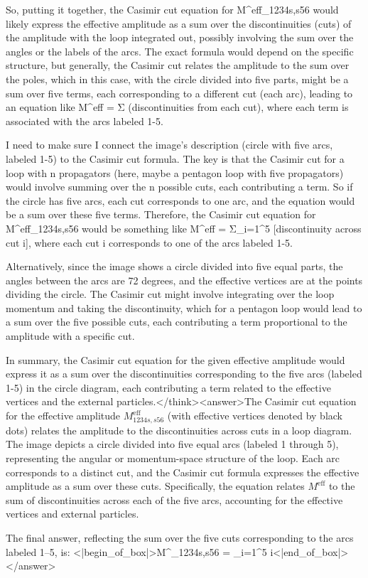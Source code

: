 So, putting it together, the Casimir cut equation for M^eff_1234s,s56 would likely express the effective amplitude as a sum over the discontinuities (cuts) of the amplitude with the loop integrated out, possibly involving the sum over the angles or the labels of the arcs. The exact formula would depend on the specific structure, but generally, the Casimir cut relates the amplitude to the sum over the poles, which in this case, with the circle divided into five parts, might be a sum over five terms, each corresponding to a different cut (each arc), leading to an equation like M^eff = Σ (discontinuities from each cut), where each term is associated with the arcs labeled 1-5. 

I need to make sure I connect the image's description (circle with five arcs, labeled 1-5) to the Casimir cut formula. The key is that the Casimir cut for a loop with n propagators (here, maybe a pentagon loop with five propagators) would involve summing over the n possible cuts, each contributing a term. So if the circle has five arcs, each cut corresponds to one arc, and the equation would be a sum over these five terms. Therefore, the Casimir cut equation for M^eff_1234s,s56 would be something like M^eff = Σ_{i=1}^5 [discontinuity across cut i], where each cut i corresponds to one of the arcs labeled 1-5. 

Alternatively, since the image shows a circle divided into five equal parts, the angles between the arcs are 72 degrees, and the effective vertices are at the points dividing the circle. The Casimir cut might involve integrating over the loop momentum and taking the discontinuity, which for a pentagon loop would lead to a sum over the five possible cuts, each contributing a term proportional to the amplitude with a specific cut. 

In summary, the Casimir cut equation for the given effective amplitude would express it as a sum over the discontinuities corresponding to the five arcs (labeled 1-5) in the circle diagram, each contributing a term related to the effective vertices and the external particles.</think><answer>The Casimir cut equation for the effective amplitude \( M^{\text{eff}}_{1234s,s56} \) (with effective vertices denoted by black dots) relates the amplitude to the discontinuities across cuts in a loop diagram. The image depicts a circle divided into five equal arcs (labeled 1 through 5), representing the angular or momentum-space structure of the loop. Each arc corresponds to a distinct cut, and the Casimir cut formula expresses the effective amplitude as a sum over these cuts. Specifically, the equation relates \( M^{\text{eff}} \) to the sum of discontinuities across each of the five arcs, accounting for the effective vertices and external particles.  

The final answer, reflecting the sum over the five cuts corresponding to the arcs labeled 1–5, is:  
<|begin_of_box|>M^{}_{1234s,s56} = \sum_{i=1}^5  i<|end_of_box|></answer>